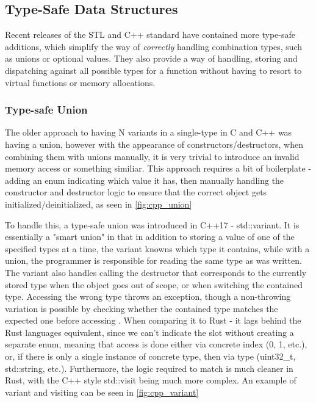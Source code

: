 \documentclass[
    english, %
]{VUMIFPSkursinis}
\begin{document}

\FloatBarrier
\subsection{Type-Safe Data Structures}

Recent releases of the STL and C++ standard have contained more type-safe additions, which simplify
the way of \textit{correctly} handling combination types, such as unions or optional values. They
also provide a way of handling, storing and dispatching against all possible types for a function without having to resort to
virtual functions or memory allocations.

\FloatBarrier
\subsubsection{Type-safe Union}

The older approach to having N variants in a single-type in C and C++ was having a union, however with the appearance of constructors/destructors, when combining them with unions manually,
it is very trivial to introduce an invalid memory access or something similiar. This approach requires a bit of boilerplate - adding an enum indicating which value it has, then manually handling the constructor and destructor logic to ensure that the correct object gets initialized/deinitialized, as seen in \cref{fig:cpp_union}


To handle this, a type-safe union was introduced in C++17 - std::variant. It is essentially a "smart union" in that in addition to storing a value of one of the specified types at a time, the variant knowns which type it contains, while with a union, the programmer is responsible for reading the same type as was written. The variant also handles calling the destructor that corresponds to the currently stored type when the object goes out of scope, or when switching the contained type. Accessing the wrong type throws an exception, though a non-throwing variation is possible by checking whether the contained type matches the expected one before accessing \cite{HandsOnCPP}.
When comparing it to Rust - it lags behind the Rust languages equivalent, since we can't indicate the slot without creating a separate enum, meaning that access is done
either via concrete index (0, 1, etc.), or, if there is only a single instance of concrete type, then via type (uint32\_t, std::string, etc.). Furthermore, the logic required to match is much cleaner in Rust, with the C++ style std::visit being much more complex. An example of variant and visiting can be seen in \cref{fig:cpp_variant}
\end{document}
